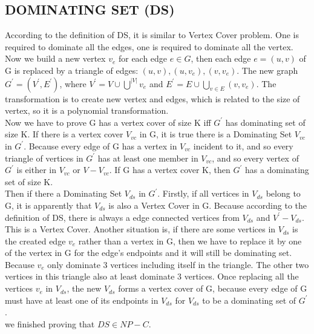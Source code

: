 \documentclass[12pt]{report}
\begin{document}
\subsection{DOMINATING SET (DS)}
According to the definition of DS, it is similar to Vertex Cover problem. One is required to dominate all the edges, one is required to dominate all the vertex. \\
Now we build a new vertex $v_{e}$ for each edge $e \in G$, then each edge $e = (u, v)$ of G is replaced by a triangle of edges: $(u, v), (u, v_{e}), (v, v_{e})$. The new graph $G^{'} = (V^{'}, E^{'})$, where $V^{'} = V \cup \bigcup^{|V|}v_{e}$ and $E^{'} = E \cup \bigcup_{v \in E}(v, v_{e})$. The transformation is to create new vertex and edges, which is related to the size of vertex, so it is a polynomial transformation. \\
Now we have to prove G has a vertex cover of size K iff $G^{'}$ has dominating set of size K. If there is a vertex cover $V_{vc}$ in G, it is true there is a Dominating Set $V_{vc}$ in $G^{'}$. Because every edge of G has a vertex in $V_{vc}$ incident to it, and so every triangle of vertices in $G^{'}$ has at least one member in $V_{vc}$, and so every vertex of $G^{'}$ is either in $V_{vc}$ or $V - V_{vc}$. If G has a vertex cover K, then $G^{'}$ has a dominating set of size K. \\
Then if there a Dominating Set $V_{ds}$ in $G^{'}$. Firstly, if all vertices in $V_{ds}$ belong to G, it is apparently that $V_{ds}$ is also a Vertex Cover in G. Because according to the definition of DS, there is always a edge connected vertices from $V_{ds}$ and $V^{'} - V_{ds}$. This is a Vertex Cover. Another situation is, if there are some vertices in $V_{ds}$ is the created edge $v_{e}$ rather than a vertex in G, then we have to replace it by one of the vertex in G for the edge's endpoints and it will still be dominating set. Because $v_{e}$ only dominate 3 vertices including itself in the triangle. The other two vertices in this triangle also at least dominate 3 vertices. Once replacing all the vertices $v_{e}$ in $V_{ds}$, the new $V_{ds}$ forms a vertex cover of G, because every edge of G must have at least one of its endpoints in $V_{ds}$ for $V_{ds}$ to be a dominating set of $G^{'}$. \\
we finished proving that $DS \in NP-C$.
\end{document}
